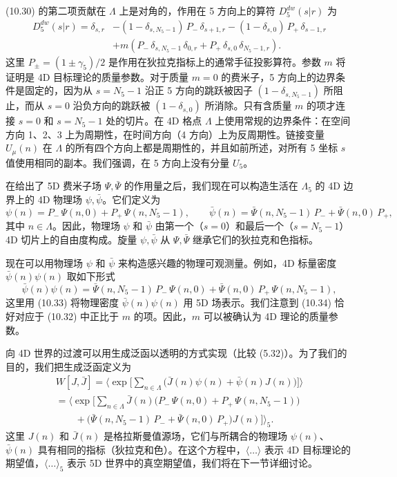 (10.30) 的第二项贡献在 $\Lambda$ 上是对角的，作用在 5 方向上的算符 $D_5^{dw}(s|r)$ 为
\begin{equation}
  \begin{split}
    D_5^{dw}(s|r) = \delta_{s,r} &- (1-\delta_{s,N_5-1})\, P_-\, \delta_{s+1,r}
    - (1-\delta_{s,0})\, P_+\, \delta_{s-1,r} \\
    &+ m\left(P_-\,\delta_{s,N_5-1}\,\delta_{0,r}
    + P_+\,\delta_{s,0}\,\delta_{N_5-1,r}\right) .
  \end{split}
\end{equation}
这里 $P_\pm = (1\pm\gamma_5)/2$ 是作用在狄拉克指标上的通常手征投影算符。参数 $m$ 将证明是 4D 目标理论的质量参数。对于质量 $m = 0$ 的费米子，5 方向上的边界条件是固定的，因为从 $s = N_5 - 1$ 沿正 5 方向的跳跃被因子 $(1-\delta_{s,N_5-1})$ 所阻止，而从 $s = 0$ 沿负方向的跳跃被 $(1-\delta_{s,0})$ 所消除。只有含质量 $m$ 的项才连接 $s = 0$ 和 $s = N_5 - 1$ 处的切片。在 4D 格点 $\Lambda$ 上使用常规的边界条件：在空间方向 1、2、3 上为周期性，在时间方向（4 方向）上为反周期性。链接变量 $U_\mu(n)$ 在 $\Lambda$ 的所有四个方向上都是周期性的，并且如前所述，对所有 5 坐标 $s$ 值使用相同的副本。我们强调，在 5 方向上没有分量 $U_5$。

在给出了 5D 费米子场 $\Psi, \bar\Psi$ 的作用量之后，我们现在可以构造生活在 $\Lambda_5$ 的 4D 边界上的 4D 物理场 $\psi, \bar\psi$。它们定义为
\begin{equation}
  \psi(n) = P_-\,\Psi(n, 0) + P_+\,\Psi(n, N_5 - 1) , \qquad
  \bar\psi(n) = \bar\Psi(n, N_5 - 1)\, P_- + \bar\Psi(n, 0)\, P_+ ,
\end{equation}
其中 $n \in \Lambda$。因此，物理场 $\psi$ 和 $\bar\psi$ 由第一个（$s = 0$）和最后一个（$s = N_5 - 1$）4D 切片上的自由度构成。旋量 $\psi, \bar\psi$ 从 $\Psi, \bar\Psi$ 继承它们的狄拉克和色指标。

现在可以用物理场 $\psi$ 和 $\bar\psi$ 来构造感兴趣的物理可观测量。例如，4D 标量密度 $\bar\psi(n)\psi(n)$ 取如下形式
\begin{equation}
  \bar\psi(n)\psi(n) = \bar\Psi(n, N_5 - 1)\, P_-\, \Psi(n, 0)
  + \bar\Psi(n, 0)\, P_+\, \Psi(n, N_5 - 1) ,
\end{equation}
这里用 (10.33) 将物理密度 $\bar\psi(n)\psi(n)$ 用 5D 场表示。我们注意到 (10.34) 恰好对应于 (10.32) 中正比于 $m$ 的项。因此，$m$ 可以被确认为 4D 理论的质量参数。

向 4D 世界的过渡可以用生成泛函以透明的方式实现（比较 (5.32)）。为了我们的目的，我们把生成泛函定义为
\begin{multline}
  W[J, \bar J] =
  \bigg\langle \exp\Big[\sum_{n\in\Lambda}
  \big(\bar J(n)\psi(n) + \bar\psi(n)J(n)\big)\Big]\bigg\rangle \\
  = \bigg\langle \exp\Big[\sum_{n\in\Lambda}
  \bar J(n)\big(P_-\,\Psi(n, 0) + P_+\,\Psi(n, N_5 - 1)\big) \\
  \qquad
  + \big(\bar\Psi(n, N_5 - 1)\, P_- + \bar\Psi(n, 0)\, P_+\big) J(n)
  \Big]\bigg\rangle_5 .
\end{multline}
这里 $J(n)$ 和 $\bar J(n)$ 是格拉斯曼值源场，它们与所耦合的物理场 $\psi(n)$、$\bar\psi(n)$ 具有相同的指标（狄拉克和色）。在这个方程中，$\langle\ldots\rangle$ 表示 4D 目标理论的期望值，$\langle\ldots\rangle_5$ 表示 5D 世界中的真空期望值，我们将在下一节详细讨论。

